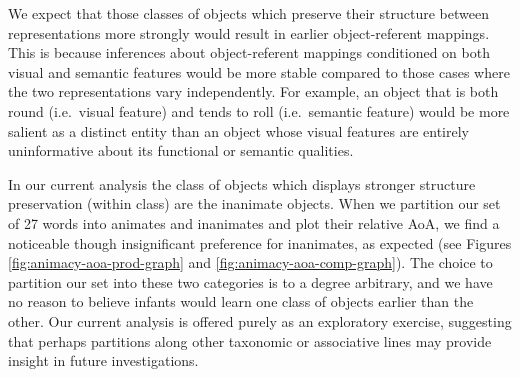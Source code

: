 \documentclass[10pt, letterpaper]{article}
\begin{document}
We expect that those classes of objects which preserve their structure
between representations more strongly would result in earlier
object-referent mappings. This is because inferences about
object-referent mappings conditioned on both visual and semantic
features would be more stable compared to those cases where the two
representations vary independently. For example, an object that is both
round (i.e.~visual feature) and tends to roll (i.e.~semantic feature)
would be more salient as a distinct entity than an object whose visual
features are entirely uninformative about its functional or semantic
qualities.

In our current analysis the class of objects which displays stronger
structure preservation (within class) are the inanimate objects. When we
partition our set of 27 words into animates and inanimates and plot
their relative AoA, we find a noticeable though insignificant preference
for inanimates, as expected (see Figures
\ref{fig:animacy-aoa-prod-graph} and \ref{fig:animacy-aoa-comp-graph}).
The choice to partition our set into these two categories is to a degree
arbitrary, and we have no reason to believe infants would learn one
class of objects earlier than the other. Our current analysis is offered
purely as an exploratory exercise, suggesting that perhaps partitions
along other taxonomic or associative lines may provide insight in future
investigations.
\end{document}
